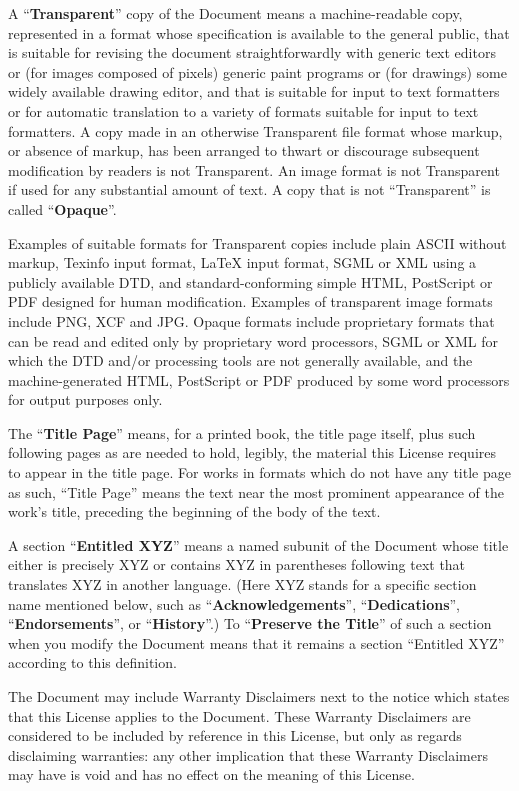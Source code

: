A ``\textbf{Transparent}'' copy of the Document means a machine-readable copy,
represented in a format whose specification is available to the
general public, that is suitable for revising the document
straightforwardly with generic text editors or (for images composed of
pixels) generic paint programs or (for drawings) some widely available
drawing editor, and that is suitable for input to text formatters or
for automatic translation to a variety of formats suitable for input
to text formatters.  A copy made in an otherwise Transparent file
format whose markup, or absence of markup, has been arranged to thwart
or discourage subsequent modification by readers is not Transparent.
An image format is not Transparent if used for any substantial amount
of text.  A copy that is not ``Transparent'' is called ``\textbf{Opaque}''.

Examples of suitable formats for Transparent copies include plain
ASCII without markup, Texinfo input format, LaTeX input format, SGML
or XML using a publicly available DTD, and standard-conforming simple
HTML, PostScript or PDF designed for human modification.  Examples of
transparent image formats include PNG, XCF and JPG.  Opaque formats
include proprietary formats that can be read and edited only by
proprietary word processors, SGML or XML for which the DTD and/or
processing tools are not generally available, and the
machine-generated HTML, PostScript or PDF produced by some word
processors for output purposes only.

The ``\textbf{Title Page}'' means, for a printed book, the title page itself,
plus such following pages as are needed to hold, legibly, the material
this License requires to appear in the title page.  For works in
formats which do not have any title page as such, ``Title Page'' means
the text near the most prominent appearance of the work's title,
preceding the beginning of the body of the text.

A section ``\textbf{Entitled XYZ}'' means a named subunit of the Document whose
title either is precisely XYZ or contains XYZ in parentheses following
text that translates XYZ in another language.  (Here XYZ stands for a
specific section name mentioned below, such as ``\textbf{Acknowledgements}'',
``\textbf{Dedications}'', ``\textbf{Endorsements}'', or ``\textbf{History}''.)  
To ``\textbf{Preserve the Title}''
of such a section when you modify the Document means that it remains a
section ``Entitled XYZ'' according to this definition.

The Document may include Warranty Disclaimers next to the notice which
states that this License applies to the Document.  These Warranty
Disclaimers are considered to be included by reference in this
License, but only as regards disclaiming warranties: any other
implication that these Warranty Disclaimers may have is void and has
no effect on the meaning of this License.


